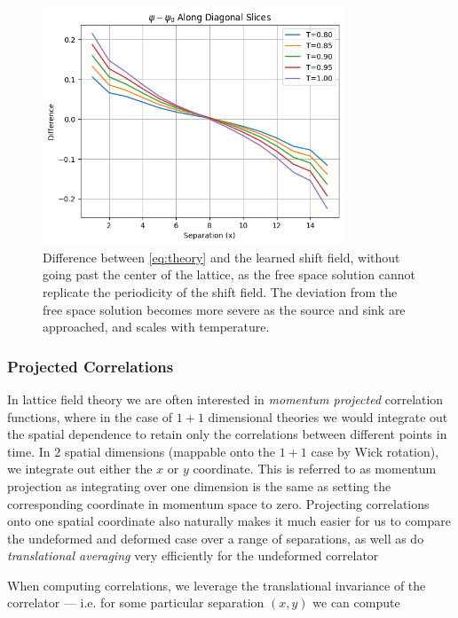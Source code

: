\documentclass[12pt]{article}
\begin{document}
\begin{figure}[h!]
	\centering
	\includegraphics[width=0.8\textwidth]{figures/vs_theory.png}
	\caption[Theory Comparison]{Difference between \ref{eq:theory} and the learned shift field, without going past the center
	of the lattice, as the free space solution cannot replicate the periodicity of the shift field. The deviation from the free space
	solution becomes more severe as the source and sink are approached, and scales with temperature.}
	\label{fig:compare}
\end{figure}

\subsubsection{Projected Correlations}

In lattice field theory we are often interested in \textit{momentum projected} correlation functions, where in the case of $1+1$ dimensional theories we would
integrate out the spatial dependence to retain only the correlations between different points in time. In $2$ spatial dimensions (mappable onto the $1+1$ case by Wick rotation), 
we integrate out either the $x$ or $y$ coordinate. This is referred to as momentum projection as integrating over one dimension is the same as setting the
corresponding coordinate in momentum space to zero. Projecting correlations onto one spatial coordinate also naturally makes it much easier for us to compare the undeformed
and deformed case over a range of separations, as well as do \textit{translational averaging} very efficiently for the undeformed correlator

When computing correlations, we leverage the translational invariance of the correlator --- i.e. for some particular separation $(x, y)$ we can
compute 
\end{document}
